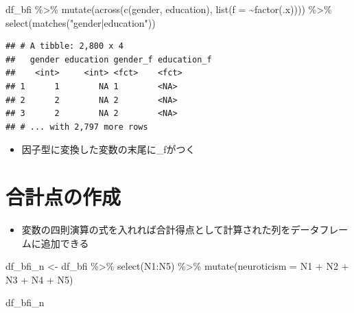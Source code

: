 \documentclass[
  xelatex,ja=standard, b5paper]{bxjsbook}
\newenvironment{Shaded}{\begin{snugshade}}{\end{snugshade}}
\newcommand{\AttributeTok}[1]{\textcolor[rgb]{0.77,0.63,0.00}{#1}}
\newcommand{\FunctionTok}[1]{\textcolor[rgb]{0.00,0.00,0.00}{#1}}
\newcommand{\NormalTok}[1]{#1}
\newcommand{\OtherTok}[1]{\textcolor[rgb]{0.56,0.35,0.01}{#1}}
\newcommand{\SpecialCharTok}[1]{\textcolor[rgb]{0.00,0.00,0.00}{#1}}
\newcommand{\StringTok}[1]{\textcolor[rgb]{0.31,0.60,0.02}{#1}}
\providecommand{\tightlist}{%
  \setlength{\itemsep}{0pt}\setlength{\parskip}{0pt}}
\begin{document}
\begin{Shaded}
\begin{Highlighting}[]
\NormalTok{df\_bfi }\SpecialCharTok{\%\textgreater{}\%}
  \FunctionTok{mutate}\NormalTok{(}\FunctionTok{across}\NormalTok{(}\FunctionTok{c}\NormalTok{(gender, education),}
                \FunctionTok{list}\NormalTok{(}\AttributeTok{f =} \SpecialCharTok{\textasciitilde{}}\FunctionTok{factor}\NormalTok{(.x)))) }\SpecialCharTok{\%\textgreater{}\%} 
  \FunctionTok{select}\NormalTok{(}\FunctionTok{matches}\NormalTok{(}\StringTok{"gender|education"}\NormalTok{))   }
\end{Highlighting}
\end{Shaded}

\begin{verbatim}
## # A tibble: 2,800 x 4
##   gender education gender_f education_f
##    <int>     <int> <fct>    <fct>      
## 1      1        NA 1        <NA>       
## 2      2        NA 2        <NA>       
## 3      2        NA 2        <NA>       
## # ... with 2,797 more rows
\end{verbatim}

\begin{itemize}
\tightlist
\item
  因子型に変換した変数の末尾に\_fがつく
\end{itemize}

\hypertarget{mu-total}{%
\section{合計点の作成}\label{mu-total}}

\begin{itemize}
\tightlist
\item
  変数の四則演算の式を入れれば合計得点として計算された列をデータフレームに追加できる
\end{itemize}

\begin{Shaded}
\begin{Highlighting}[]
\NormalTok{df\_bfi\_n }\OtherTok{\textless{}{-}} 
\NormalTok{  df\_bfi }\SpecialCharTok{\%\textgreater{}\%}
  \FunctionTok{select}\NormalTok{(N1}\SpecialCharTok{:}\NormalTok{N5) }\SpecialCharTok{\%\textgreater{}\%}                       
  \FunctionTok{mutate}\NormalTok{(}\AttributeTok{neuroticism =}\NormalTok{ N1 }\SpecialCharTok{+}\NormalTok{ N2 }\SpecialCharTok{+}\NormalTok{ N3 }\SpecialCharTok{+}\NormalTok{ N4 }\SpecialCharTok{+}\NormalTok{ N5)}
  
\NormalTok{df\_bfi\_n}
\end{Highlighting}
\end{Shaded}
\end{document}
